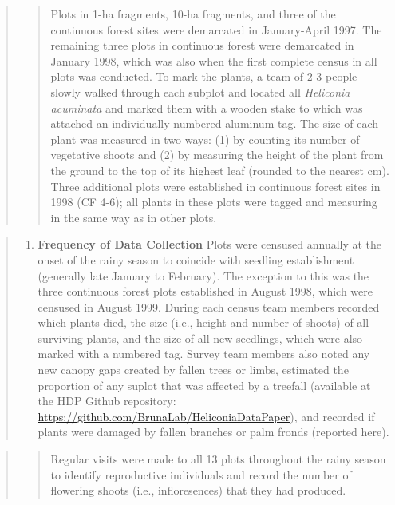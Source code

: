 \documentclass[
  12pt,
  man, donotrepeattitle]{apa6}
\providecommand{\tightlist}{%
  \setlength{\itemsep}{0pt}\setlength{\parskip}{0pt}}
\begin{document}
\begin{quote}
\begin{quote}
Plots in 1-ha fragments, 10-ha fragments, and three of the continuous forest sites were demarcated in January-April 1997. The remaining three plots in continuous forest were demarcated in January 1998, which was also when the first complete census in all plots was conducted. To mark the plants, a team of 2-3 people slowly walked through each subplot and located all \emph{Heliconia acuminata} and marked them with a wooden stake to which was attached an individually numbered aluminum tag. The size of each plant was measured in two ways: (1) by counting its number of vegetative shoots and (2) by measuring the height of the plant from the ground to the top of its highest leaf (rounded to the nearest cm). Three additional plots were established in continuous forest sites in 1998 (CF 4-6); all plants in these plots were tagged and measuring in the same way as in other plots.
\end{quote}
\end{quote}

\begin{quote}
\begin{enumerate}
\def\labelenumi{\alph{enumi}.}
\setcounter{enumi}{3}
\tightlist
\item
  \textbf{Frequency of Data Collection} Plots were censused annually at the onset of the rainy season to coincide with seedling establishment (generally late January to February). The exception to this was the three continuous forest plots established in August 1998, which were censused in August 1999. During each census team members recorded which plants died, the size (i.e., height and number of shoots) of all surviving plants, and the size of all new seedlings, which were also marked with a numbered tag. Survey team members also noted any new canopy gaps created by fallen trees or limbs, estimated the proportion of any suplot that was affected by a treefall (available at the HDP Github repository: \url{https://github.com/BrunaLab/HeliconiaDataPaper}), and recorded if plants were damaged by fallen branches or palm fronds (reported here).
\end{enumerate}
\end{quote}

\begin{quote}
\begin{quote}
Regular visits were made to all 13 plots throughout the rainy season to identify reproductive individuals and record the number of flowering shoots (i.e., infloresences) that they had produced.
\end{quote}
\end{quote}
\end{document}
